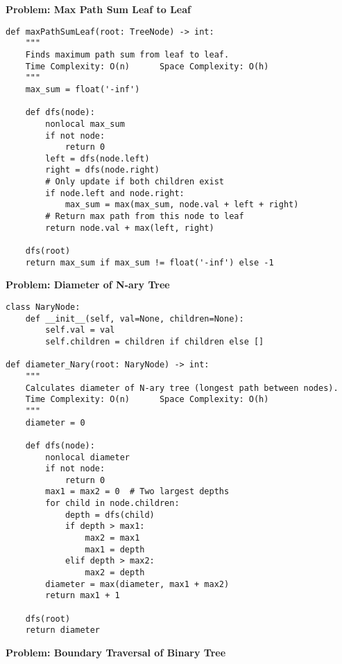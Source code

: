 \noindent\textbf{Problem: Max Path Sum Leaf to Leaf}
\begin{verbatim}
def maxPathSumLeaf(root: TreeNode) -> int:
    """
    Finds maximum path sum from leaf to leaf.
    Time Complexity: O(n)      Space Complexity: O(h)
    """
    max_sum = float('-inf')
    
    def dfs(node):
        nonlocal max_sum
        if not node:
            return 0
        left = dfs(node.left)
        right = dfs(node.right)
        # Only update if both children exist
        if node.left and node.right:
            max_sum = max(max_sum, node.val + left + right)
        # Return max path from this node to leaf
        return node.val + max(left, right)
    
    dfs(root)
    return max_sum if max_sum != float('-inf') else -1
\end{verbatim}
\noindent\textbf{Problem: Diameter of N-ary Tree}
\begin{verbatim}
class NaryNode:
    def __init__(self, val=None, children=None):
        self.val = val
        self.children = children if children else []

def diameter_Nary(root: NaryNode) -> int:
    """
    Calculates diameter of N-ary tree (longest path between nodes).
    Time Complexity: O(n)      Space Complexity: O(h)
    """
    diameter = 0
    
    def dfs(node):
        nonlocal diameter
        if not node:
            return 0
        max1 = max2 = 0  # Two largest depths
        for child in node.children:
            depth = dfs(child)
            if depth > max1:
                max2 = max1
                max1 = depth
            elif depth > max2:
                max2 = depth
        diameter = max(diameter, max1 + max2)
        return max1 + 1
    
    dfs(root)
    return diameter
\end{verbatim}
\noindent\textbf{Problem: Boundary Traversal of Binary Tree}
